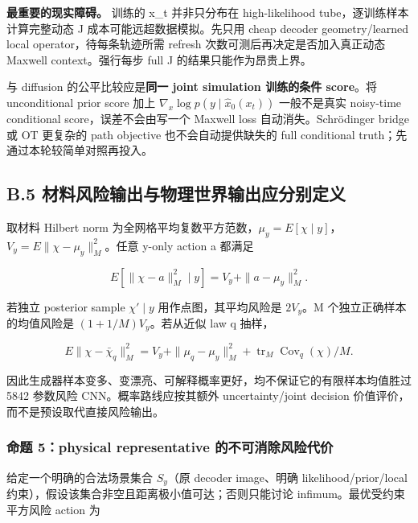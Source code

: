 \documentclass[
  11pt,
  a4paper,
]{article}
\begin{document}
\textbf{最重要的现实障碍。} 训练的 x\_\allowbreak{}t 并非只分布在 high-likelihood
tube，逐训练样本计算完整动态 J 成本可能远超数据模拟。先只用 cheap
decoder geometry/learned local operator，待每条轨迹所需 refresh
次数可测后再决定是否加入真正动态 Maxwell context。强行每步 full J
的结果只能作为昂贵上界。

与 diffusion 的公平比较应是\textbf{同一 joint simulation 训练的条件
score}。将 unconditional prior score 加上
\(\nabla_x\log p(y\mid\hat x_0(x_t))\) 一般不是真实 noisy-time
conditional score，误差不会由写一个 Maxwell loss 自动消失。Schrödinger
bridge 或 OT 更复杂的 path objective 也不会自动提供缺失的 full
conditional truth；先通过本轮较简单对照再投入。

\hypertarget{b.5-ux6750ux6599ux98ceux9669ux8f93ux51faux4e0eux7269ux7406ux4e16ux754cux8f93ux51faux5e94ux5206ux522bux5b9aux4e49}{%
\subsection{B.5
材料风险输出与物理世界输出应分别定义}\label{b.5-ux6750ux6599ux98ceux9669ux8f93ux51faux4e0eux7269ux7406ux4e16ux754cux8f93ux51faux5e94ux5206ux522bux5b9aux4e49}}

取材料 Hilbert norm
为全网格平均复数平方范数，\(\mu_y=E[\chi\mid y]\)，\(V_y=E\|\chi-\mu_y\|_M^2\)。任意
y-only action a 都满足

\[
E[\|\chi-a\|_M^2\mid y]=V_y+\|a-\mu_y\|_M^2.
\]

若独立 posterior sample \(\chi'\mid y\) 用作点图，其平均风险是
\(2V_y\)。M 个独立正确样本的均值风险是 \((1+1/M)V_y\)。若从近似 law q
抽样，

\[
E\|\chi-\bar\chi_q\|_M^2
=V_y+\|\mu_q-\mu_y\|_M^2+\operatorname{tr}_M\operatorname{Cov}_q(\chi)/M.
\]

因此生成器样本变多、变漂亮、可解释概率更好，均不保证它的有限样本均值胜过
5842 参数风险 CNN。概率路线应按其额外 uncertainty/joint decision
价值评价，而不是预设取代直接风险输出。

\hypertarget{ux547dux9898-5physical-representative-ux7684ux4e0dux53efux6d88ux9664ux98ceux9669ux4ee3ux4ef7}{%
\subsubsection{命题 5：physical representative
的不可消除风险代价}\label{ux547dux9898-5physical-representative-ux7684ux4e0dux53efux6d88ux9664ux98ceux9669ux4ee3ux4ef7}}

给定一个明确的合法场景集合 \(S_y\)（原 decoder image、明确
likelihood/prior/local
约束），假设该集合非空且距离极小值可达；否则只能讨论
infimum。最优受约束平方风险 action 为
\end{document}
